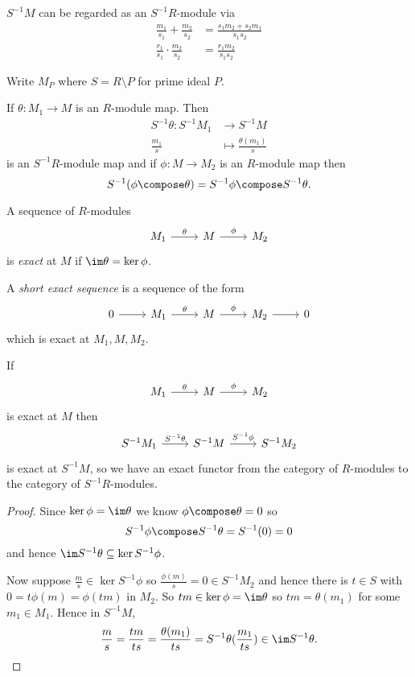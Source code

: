 \documentclass[a4paper]{article}
\begin{document}
\(S^{-1}M\) can be regarded as an \(S^{-1}R\)-module via
\begin{align*}
  \frac{m_1}{s_1} + \frac{m_2}{s_2} &= \frac{s_1m_2 + s_2m_1}{s_1s_2} \\
  \frac{r_1}{s_1} \cdot \frac{m_2}{s_2} &= \frac{r_1m_2}{s_1s_2}
\end{align*}

Write \(M_P\) where \(S = R \setminus P\) for prime ideal \(P\).

If \(\theta: M_1 \to M\) is an \(R\)-module map. Then
\begin{align*}
  S^{-1}\theta: S^{-1}M_1 &\to S^{-1}M \\
  \frac{m_1}{s} &\mapsto \frac{\theta(m_1)}{s}
\end{align*}
is an \(S^{-1}R\)-module map and if \(\phi: M \to M_2\) is an \(R\)-module map then
\[
  S^{-1}(\phi \compose \theta) = S^{-1} \phi \compose S^{-1} \theta.
\]

\begin{definition}
  A sequence of \(R\)-modules
  \[
    \begin{tikzcd}
      M_1 \ar[r, "\theta"] & M \ar[r, "\phi"] & M_2
    \end{tikzcd}
  \]
  is \emph{exact} at \(M\) if \(\im \theta = \ker \phi\).

  A \emph{short exact sequence} is a sequence of the form
  \[
    \begin{tikzcd}
      0 \ar[r] & M_1 \ar[r, "\theta"] & M \ar[r, "\phi"] & M_2 \ar[r] & 0
    \end{tikzcd}
  \]
  which is exact at \(M_1, M, M_2\).
\end{definition}

\begin{lemma}
  If
  \[
    \begin{tikzcd}
      M_1 \ar[r, "\theta"] & M \ar[r, "\phi"] & M_2
    \end{tikzcd}
  \]
  is exact at \(M\) then
  \[
    \begin{tikzcd}
      S^{-1} M_1 \ar[r, "S^{-1} \theta"] & S^{-1} M \ar[r, "S^{-1} \phi"] & S^{-1} M_2
    \end{tikzcd}
  \]
  is exact at \(S^{-1}M\), so we have an exact functor from the category of \(R\)-modules to the category of \(S^{-1}R\)-modules.
\end{lemma}

\begin{proof}
  Since \(\ker \phi = \im \theta\) we know \(\phi \compose \theta = 0\) so
  \[
    S^{-1} \phi \compose S^{-1} \theta = S^{-1}(0) = 0
  \]
  and hence \(\im S^{-1} \theta \subseteq \ker S^{-1} \phi\).

  Now suppose \(\frac{m}{s} \in \ker S^{-1} \phi\) so \(\frac{\phi(m)}{s} = 0 \in S^{-1}M_2\) and hence there is \(t \in S\) with \(0 = t \phi(m) = \phi(tm)\) in \(M_2\). So \(tm \in \ker \phi = \im \theta\) so \(tm = \theta(m_1)\) for some \(m_1 \in M_1\). Hence in \(S^{-1}M\),
  \[
    \frac{m}{s} = \frac{tm}{ts} = \frac{\theta(m_1)}{ts} = S^{-1} \theta(\frac{m_1}{ts}) \in \im S^{-1} \theta.
  \]
\end{proof}
\end{document}
